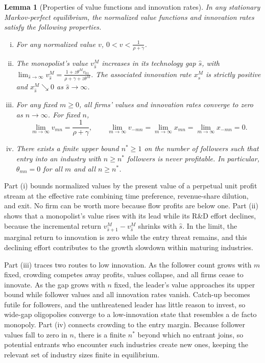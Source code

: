 \documentclass[12pt]{article}
\newtheorem{lemma}[proposition]{Lemma}
\begin{document}
\begin{lemma}[Properties of value functions and innovation rates] \label{lem:value}
    In any stationary Markov-perfect equilibrium, the normalized value functions and innovation rates satisfy the following properties.
    \begin{enumerate}[(i)]
        \item For any normalized value \(v\), \(0 < v < \frac{1}{\rho+\gamma}\).

        \item The monopolist's value \(v^M_{\hat{s}}\) increases in its technology gap \(\hat{s}\), with \(\lim_{\hat{s}\to\infty} v^M_{\hat{s}} = \frac{1+z\theta^M v_{01}}{\rho+\gamma+z\theta^M}\). The associated innovation rate \(x^M_{\hat{s}}\) is strictly positive and \(x^M_{\hat{s}} \searrow 0\) as \(\hat{s} \to \infty\).

        \item For any fixed \(m\geq0\), all firms' values and innovation rates converge to zero as \(n\to\infty\). For fixed \(n\),
            \[\lim_{m \to \infty} v_{mn} = \frac{1}{\rho + \gamma},\qquad
              \lim_{m\to\infty}v_{-mn}=\lim_{m\to\infty}x_{mn}=\lim_{m\to\infty}x_{-mn}=0.\]

        \item There exists a finite upper bound \(n^\ast \ge 1\) on the number of followers such that entry into an industry with \(n \ge n^\ast\) followers is never profitable. In particular, \(\theta_{mn} = 0\) for all \(m\) and all \(n \ge n^\ast\).
    \end{enumerate}    
\end{lemma}

Part (i) bounds normalized values by the present value of a perpetual unit profit stream at the effective rate combining time preference, revenue-share dilution, and exit. No firm can be worth more because flow profits are below one. Part (ii) shows that a monopolist's value rises with its lead while its R\&D effort declines, because the incremental return \(v^M_{\hat{s}+1} - v^M_{\hat{s}}\) shrinks with \(\hat{s}\). In the limit, the marginal return to innovation is zero while the entry threat remains, and this declining effort contributes to the growth slowdown within maturing industries.

Part (iii) traces two routes to low innovation. As the follower count grows with \(m\) fixed, crowding competes away profits, values collapse, and all firms cease to innovate. As the gap grows with \(n\) fixed, the leader's value approaches its upper bound while follower values and all innovation rates vanish. Catch-up becomes futile for followers, and the unthreatened leader has little reason to invest, so wide-gap oligopolies converge to a low-innovation state that resembles a de facto monopoly. Part (iv) connects crowding to the entry margin. Because follower values fall to zero in \(n\), there is a finite \(n^\ast\) beyond which no entrant joins, so potential entrants who encounter such industries create new ones, keeping the relevant set of industry sizes finite in equilibrium.
\end{document}
